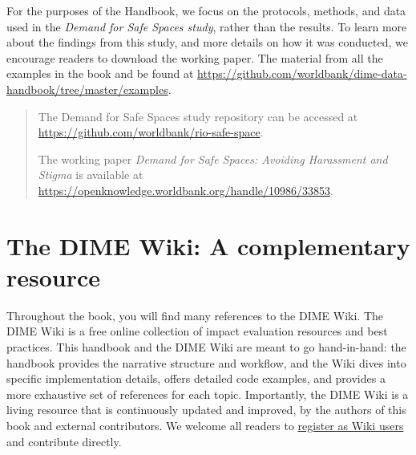 \documentclass[
]{book}
\begin{document}
\begin{ex}
For the purposes of the Handbook, we focus on the protocols, methods, and data used in the \emph{Demand for Safe Spaces study}, rather than the results. To learn more about the findings from this study, and more details on how it was conducted, we encourage readers to download the working paper.
The material from all the examples in the book and be found at \url{https://github.com/worldbank/dime-data-handbook/tree/master/examples}.

\begin{quote}
The Demand for Safe Spaces study repository can be accessed at \url{https://github.com/worldbank/rio-safe-space}.

The working paper \emph{Demand for Safe Spaces: Avoiding Harassment and Stigma} is available at \url{https://openknowledge.worldbank.org/handle/10986/33853}.
\end{quote}
\end{ex}

\hypertarget{the-dime-wiki-a-complementary-resource}{%
\section*{The DIME Wiki: A complementary resource}\label{the-dime-wiki-a-complementary-resource}}

Throughout the book, you will find many references to the DIME Wiki. The DIME Wiki is a free online collection of impact evaluation resources and best practices. This handbook and the DIME Wiki are meant to go hand-in-hand: the handbook provides the narrative structure and workflow, and the Wiki dives into specific implementation details, offers detailed code examples, and provides a more exhaustive set of references for each topic. Importantly, the DIME Wiki is a living resource that is continuously updated and improved, by the authors of this book and external contributors. We welcome all readers to \href{https://dimewiki.worldbank.org/New_Users}{register as Wiki users} and contribute directly.
\end{document}
